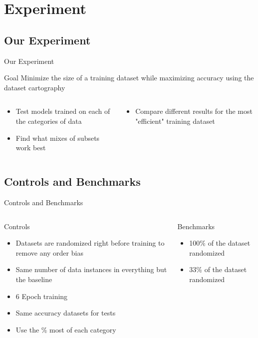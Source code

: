 \documentclass[
	11pt,
]{beamer}
\begin{document}
\section{Experiment}

\subsection{Our Experiment}
\begin{frame}[t]{Our Experiment}
	\begin{block}{Goal}
		Minimize the size of a training dataset while maximizing accuracy using the dataset cartography
	\end{block}
	\begin{columns}[t]
		\begin{column}{.5\textwidth}
			\begin{itemize}
				\item Test models trained on each of the categories of data
				\item Find what mixes of subsets work best
			\end{itemize}
		\end{column}
		\begin{column}{.5\textwidth}
			\begin{itemize}
				\item Compare different results for the most "efficient" training dataset
			\end{itemize}
		\end{column}
	\end{columns}
\end{frame}


\subsection{Controls and Benchmarks}
\begin{frame}[t]{Controls and Benchmarks    }
	\begin{columns}[t]
		\begin{column}{.5\textwidth}
			Controls
			\begin{itemize}
				\item Datasets are randomized right before training to remove any order bias
				\item Same number of data instances in everything but the baseline
				\item 6 Epoch training
				\item Same accuracy datasets for tests
				\item Use the \% most of each category
			\end{itemize}
		\end{column}
		\begin{column}{.5\textwidth}
			Benchmarks
			\begin{itemize}
				\item 100\% of the dataset randomized
				\item 33\% of the dataset randomized
			\end{itemize}
		\end{column}
	\end{columns}
\end{frame}
\end{document}
